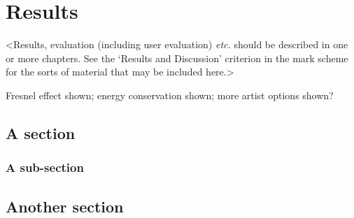 \chapter{Results}
\label{chapter3}

<Results, evaluation (including user evaluation) {\em etc.} should be described in one or more chapters. See the `Results and Discussion' criterion in the mark scheme for the sorts of material that may be included here.>

Fresnel effect shown; energy conservation shown; more artist options shown?

\section{A section}
\lipsum[8]

\subsection{A sub-section}
\lipsum[11]

\section{Another section}
\lipsum[12]
